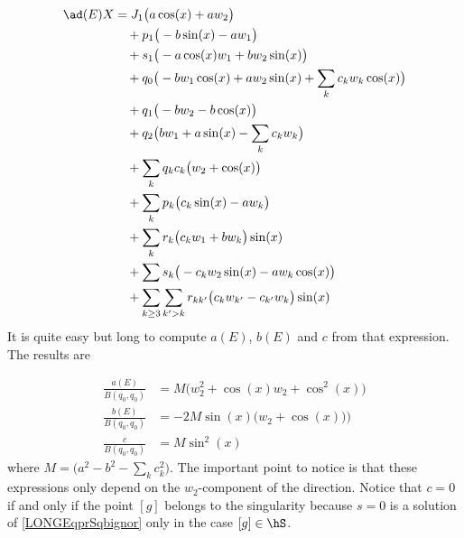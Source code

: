 \begin{equation}
	\begin{aligned}[]
		\ad(E)X & = J_1\big( a\cos(x)+aw_2 \big)                                                  \\
		        & \quad +  p_1\big( -b\sin(x)-aw_1 \big)                                          \\
		        & \quad+  s_1\big( -a\cos(x)w_1+bw_2\sin(x) \big)                                 \\
		        & \quad  +  q_0\big( -bw_1\cos(x)+aw_2\sin(x)+\sum_{k}c_kw_k\cos(x) \big)         \\
		        & \quad +  q_1\big( -bw_2-b\cos(x) \big)                                          \\
		        & \quad +  q_2\big( bw_1+a\sin(x)-\sum_kc_kw_k \big)                              \\
		        & \quad +  \sum_kq_kc_k\big( w_2+\cos(x) \big)                                    \\
		        & \quad +  \sum_kp_k\big( c_k\sin(x)-aw_k \big)                                   \\
		        & \quad +  \sum_k r_k\big( c_kw_1+bw_k \big)\sin(x)                               \\
		        & \quad +  \sum s_k\big( -c_kw_2\sin(x)-aw_k\cos(x) \big)                         \\
		        & \quad + \sum_{k\geq 3}\sum_{k'>k} r_{kk'}\big( c_kw_{k'}-c_{k'}w_k \big)\sin(x)
	\end{aligned}
\end{equation}
It is quite easy but long to compute $a(E)$, $b(E)$ and $c$ from that expression. The results are
%

\begin{subequations}\label{LONGEqCoefsabcBE}
	\begin{align}
		\frac{ a(E) }{ B(q_0,q_0) } & =M\Big( w_2^2+\cos(x)w_2+\cos^2(x)\Big)       \label{LONGEqCoeffaE} \\
		\frac{ b(E) }{ B(q_0,q_0) } & =-2M\sin(x)\big( w_2+\cos(x)\big))                                  \\
		\frac{ c }{ B(q_0,q_0) }    & =M\sin^2(x)
	\end{align}
\end{subequations}
where $M=\big( a^2-b^2-\sum_kc_k^2 \big)$. The important point to notice is that these expressions only depend on the $w_2$-component of the direction. Notice that $c=0$ if and only if the point $[g]$ belongs to the singularity because $s=0$ is a solution of \eqref{LONGEqprSqbignor} only in the case $[g]\in\hS$.

